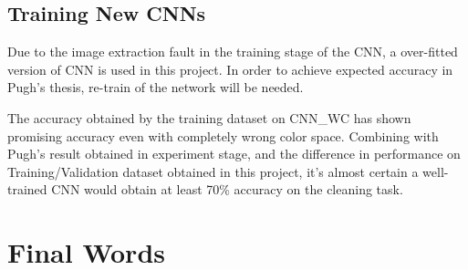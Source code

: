 \documentclass[bsc,logo,twoside,fullspacing,parskip]{infthesis}
\begin{document}
\subsection{Training New CNNs}

Due to the image extraction fault in the training stage of the CNN, a over-fitted version of CNN is used in this project. 
In order to achieve expected accuracy in Pugh's thesis\cite{Pugh}, re-train of the network will be needed.

The accuracy obtained by the training dataset on CNN\_WC has shown promising accuracy even with completely wrong color space. Combining with Pugh's result obtained in experiment stage, and the difference in performance on Training/Validation dataset obtained in this project, it's almost certain a well-trained CNN would obtain at least 70\% accuracy on the cleaning task. 

\section{Final Words}




\end{document}

